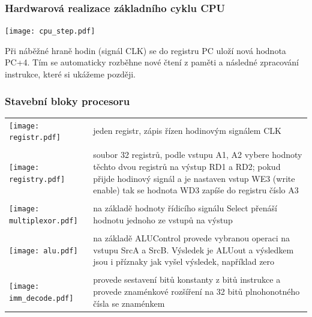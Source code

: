 \documentclass{beamer}
\begin{document}
\begin{frame}
\frametitle{Hardwarová realizace základního cyklu CPU}

\begin{center}
\texttt{[image: cpu\_step.pdf]}
\end{center}

Při náběžné hraně hodin (signál CLK) se do registru PC uloží nová hodnota PC+4. Tím se automaticky rozběhne nové čtení z paměti a následné zpracování instrukce, které si ukážeme později.
\end{frame}

\begin{frame}
\frametitle{Stavební bloky procesoru}

\begin{table}
\footnotesize
\begin{tabular}{m{1.6cm} m{9.5cm}}
\hfill \texttt{[image: registr.pdf]} & jeden registr, zápis řízen hodinovým signálem CLK \\ 
\phantom{X} & \phantom{X} \\
\hfill \texttt{[image: registry.pdf]} & soubor 32 registrů, podle vstupu A1, A2 vybere hodnoty těchto dvou registrů na výstup RD1 a RD2; pokud přijde hodinový signál a je nastaven vstup WE3 (write enable) tak se hodnota WD3 zapíše do registru číslo A3 \\
\phantom{X} & \phantom{X} \\
\hfill \texttt{[image: multiplexor.pdf]} & na základě hodnoty řídicího signálu Select přenáší hodnotu jednoho ze vstupů na výstup \\ 
\phantom{X} & \phantom{X} \\
\hfill \texttt{[image: alu.pdf]} & na základě ALUControl provede vybranou operaci na vstupu SrcA a SrcB. Výsledek je ALUout a výsledkem jsou i příznaky jak vyšel výsledek, například zero \\ 
\phantom{X} & \phantom{X} \\
\hfill \texttt{[image: imm\_decode.pdf]} & provede sestavení bitů konstanty z bitů instrukce a provede znaménkové rozšíření na 32 bitů plnohonotného čísla se znaménkem \\ 
\end{tabular}
\end{table}

\end{frame}
\end{document}
